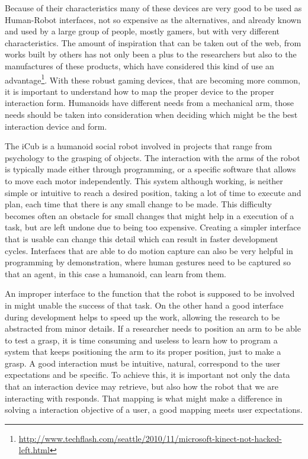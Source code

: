  Because of their characteristics many of these devices are very good to be used as Human-Robot interfaces, not so expensive as the alternatives, and already known and used by a large group of people, mostly gamers, but with very different characteristics. The amount of inspiration that can be taken out of the web, from works built by others has not only been a plus to the researchers but also to the manufactures of these products, which have considered this kind of use an advantage\footnote{\url{http://www.techflash.com/seattle/2010/11/microsoft-kinect-not-hacked-left.html}}. With these robust gaming devices, that are becoming more common, it is important to understand how to map the proper device to the proper interaction form. Humanoids have different needs from a mechanical arm, those needs should be taken into consideration when deciding which might be the best interaction device and form.

 The iCub is a humanoid social robot involved in projects that range from psychology to the grasping of objects. The interaction with the arms of the robot is typically made either through programming, or a specific software that allows to move each motor independently. This system although working, is neither simple or intuitive to reach a desired position, taking a lot of time to execute and plan, each time that there is any small change to be made. This difficulty becomes often an obstacle for small changes that might help in a execution of a task, but are left undone due to being too expensive. Creating a simpler interface that is usable can change this detail which can result in faster development cycles. Interfaces that are able to do motion capture can also be very helpful in programming by demonstration, where human gestures need to be captured so that an agent, in this case a humanoid, can learn from them.

 An improper interface to the function that the robot is supposed to be involved in might unable the success of that task. On the other hand a good interface during development helps to speed up the work, allowing the research to be abstracted from minor details. If a researcher needs to position an arm to be able to test a grasp, it is time consuming and useless to learn how to program a system that keeps positioning the arm to its proper position, just to make a grasp. A good interaction must be intuitive, natural, correspond to the user expectations and be specific. To achieve this, it is important not only the data that an interaction device may retrieve, but also how the robot that we are interacting with responds. That mapping is what might make a difference in solving a interaction objective of a user, a good mapping meets user expectations.
 
